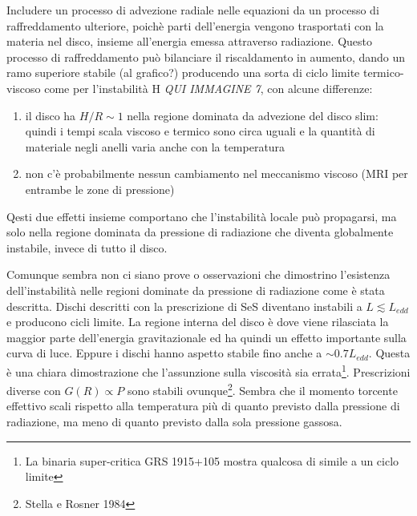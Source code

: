 \documentclass[a4paperbi]{article}
\begin{document}
	Includere un processo di advezione radiale nelle equazioni da un processo di raffreddamento ulteriore, poichè parti dell'energia vengono trasportati con la materia nel disco, insieme all'energia emessa attraverso radiazione. Questo processo di raffreddamento può bilanciare il riscaldamento in aumento, dando un ramo superiore stabile (al grafico?) producendo una sorta di ciclo limite termico-viscoso come per l'instabilità H \emph{QUI IMMAGINE 7}, con alcune differenze:
	\begin{enumerate}
		\item il disco ha $H/R\sim1$ nella regione dominata da advezione del disco slim: quindi i tempi scala viscoso e termico sono circa uguali e la quantità di materiale negli anelli varia anche con la temperatura
		\item non c'è probabilmente nessun cambiamento nel meccanismo viscoso (MRI per entrambe le zone di pressione)
	\end{enumerate}
	Qesti due effetti insieme comportano che l'instabilità locale può propagarsi, ma solo nella regione dominata da pressione di radiazione che diventa globalmente instabile, invece di tutto il disco.
	
	Comunque sembra non ci siano prove o osservazioni che dimostrino l'esistenza dell'instabilità nelle regioni dominate da pressione di radiazione come è stata descritta. Dischi descritti con la prescrizione di SeS diventano instabili a $L\lesssim L_{edd}$ e producono cicli limite. La regione interna del disco è dove viene rilasciata la maggior parte dell'energia gravitazionale ed ha quindi un effetto importante sulla curva di luce. Eppure i dischi hanno aspetto stabile fino anche a $\sim0.7L_{edd}$. Questa è una chiara dimostrazione che l'assunzione sulla viscosità sia errata\footnote{La binaria super-critica GRS 1915+105 mostra qualcosa di simile a un ciclo limite}. Prescrizioni diverse con $G(R)\propto P$ sono stabili ovunque\footnote{Stella e Rosner 1984}. Sembra che il momento torcente effettivo scali rispetto alla temperatura più di quanto previsto dalla pressione di radiazione, ma meno di quanto previsto dalla sola pressione gassosa.
	
\end{document}
